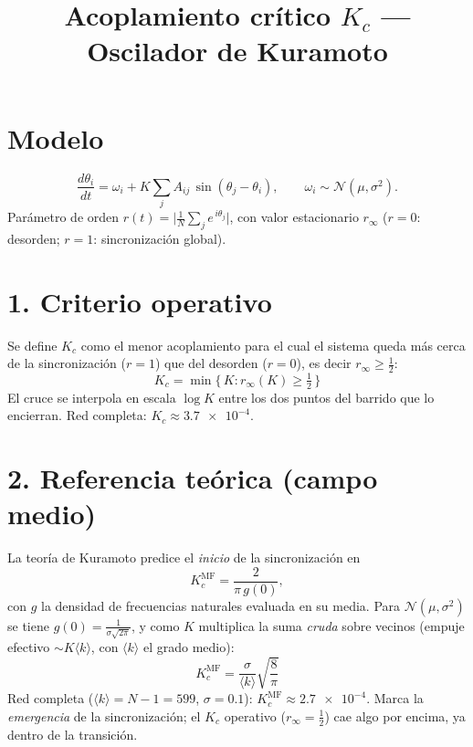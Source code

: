 \documentclass[11pt]{article}
\title{Acoplamiento crítico $K_c$ --- Oscilador de Kuramoto}
\author{}
\date{}
\begin{document}
\maketitle
\vspace{-3em}

\section*{Modelo}
\[
\frac{d\theta_i}{dt} = \omega_i + K\sum_j A_{ij}\,\sin(\theta_j-\theta_i),
\qquad \omega_i\sim\mathcal{N}(\mu,\sigma^2).
\]
Parámetro de orden $r(t)=\bigl|\tfrac{1}{N}\sum_j e^{\,i\theta_j}\bigr|$, con valor
estacionario $r_\infty$ ($r=0$: desorden; $r=1$: sincronización global).

\section*{1. Criterio operativo}
Se define $K_c$ como el menor acoplamiento para el cual el sistema queda más cerca
de la sincronización ($r=1$) que del desorden ($r=0$), es decir $r_\infty \ge \tfrac{1}{2}$:
\[
\boxed{\;K_c = \min\bigl\{\,K : r_\infty(K) \ge \tfrac{1}{2}\,\bigr\}\;}
\]
El cruce se interpola en escala $\log K$ entre los dos puntos del barrido que lo
encierran. Red completa: $K_c \approx \num{3.7e-4}$.

\section*{2. Referencia teórica (campo medio)}
La teoría de Kuramoto predice el \emph{inicio} de la sincronización en
\[
K_c^{\text{MF}} = \frac{2}{\pi\,g(0)},
\]
con $g$ la densidad de frecuencias naturales evaluada en su media. Para
$\mathcal{N}(\mu,\sigma^2)$ se tiene $g(0)=\tfrac{1}{\sigma\sqrt{2\pi}}$, y como $K$
multiplica la suma \emph{cruda} sobre vecinos (empuje efectivo $\sim K\langle k\rangle$,
con $\langle k\rangle$ el grado medio):
\[
\boxed{\;K_c^{\text{MF}} = \frac{\sigma}{\langle k\rangle}\sqrt{\frac{8}{\pi}}\;}
\]
Red completa ($\langle k\rangle = N-1 = 599$, $\sigma=\num{0.1}$):
$K_c^{\text{MF}} \approx \num{2.7e-4}$. Marca la \emph{emergencia} de la
sincronización; el $K_c$ operativo ($r_\infty=\tfrac12$) cae algo por encima, ya
dentro de la transición.
\end{document}
